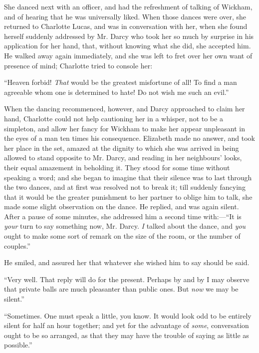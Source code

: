 She danced next with an officer, and had the refreshment of talking of Wickham, and of hearing that he was universally liked. When those dances were over, she returned to Charlotte Lucas, and was in conversation with her, when she found herself suddenly addressed by Mr. Darcy who took her so much by surprise in his application for her hand, that, without knowing what she did, she accepted him. He walked away again immediately, and she was left to fret over her own want of presence of mind; Charlotte tried to console her:


“Heaven forbid! {\em That} would be the greatest misfortune of all! To find a man agreeable whom one is determined to hate! Do not wish me such an evil.”

When the dancing recommenced, however, and Darcy approached to claim her hand, Charlotte could not help cautioning her in a whisper, not to be a simpleton, and allow her fancy for Wickham to make her appear unpleasant in the eyes of a man ten times his consequence. Elizabeth made no answer, and took her place in the set, amazed at the dignity to which she was arrived in being allowed to stand opposite to Mr. Darcy, and reading in her neighbours' looks, their equal amazement in beholding it. They stood for some time without speaking a word; and she began to imagine that their silence was to last through the two dances, and at first was resolved not to break it; till suddenly fancying that it would be the greater punishment to her partner to oblige him to talk, she made some slight observation on the dance. He replied, and was again silent. After a pause of some minutes, she addressed him a second time with:---“It is {\em your} turn to say something now, Mr. Darcy. {\em I} talked about the dance, and {\em you} ought to make some sort of remark on the size of the room, or the number of couples.”

He smiled, and assured her that whatever she wished him to say should be said.

“Very well. That reply will do for the present. Perhaps by and by I may observe that private balls are much pleasanter than public ones. But {\em now} we may be silent.”


“Sometimes. One must speak a little, you know. It would look odd to be entirely silent for half an hour together; and yet for the advantage of {\em some}, conversation ought to be so arranged, as that they may have the trouble of saying as little as possible.”

